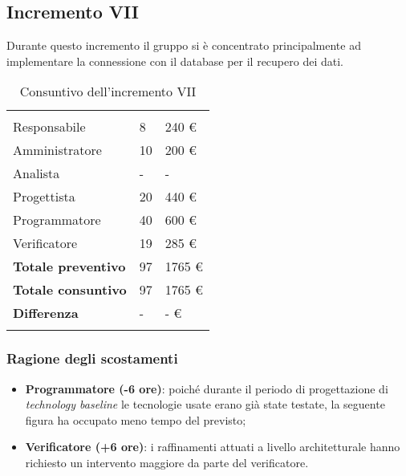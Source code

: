 \subsection{Incremento VII}
Durante questo incremento il gruppo si è concentrato principalmente ad implementare la connessione con il database per il recupero dei dati.
{
\setlength\arrayrulewidth{1pt}
\begin{longtable}{ C{4cm} C{3cm} C{3.5cm}} 
 	 &
 	 &
 	 \\
 	
 	Responsabile & 8 & 240 € \\
 	Amministratore & 10 & 200 €\\
 	Analista & - & - \\
 	Progettista & 20 & 440 € \\
 	Programmatore & 40  & 600 € \\
 	Verificatore & 19  & 285 € \\
 	
	\hline 	
 	
 	\textbf{Totale preventivo} &
	97 &
 	1765 € \\		
 	
 	\textbf{Totale consuntivo} &
	97 &
 	1765 € \\	
 	
 	\textbf{Differenza} &
	- &
 	- € \\	
 	
 	\caption{Consuntivo dell'incremento VII}
\end{longtable}
}

\subsubsection{Ragione degli scostamenti}

\begin{itemize}
\item \textbf{Programmatore (-6 ore)}: poiché durante il periodo di progettazione di \textit{technology baseline} le tecnologie usate erano già state testate, la seguente figura ha occupato meno tempo del previsto; 

\item \textbf{Verificatore (+6 ore)}: i raffinamenti attuati a livello architetturale hanno richiesto un intervento maggiore da parte del verificatore.
\end{itemize}

